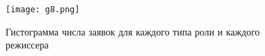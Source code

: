 \documentclass[a3paper]{article}
\begin{document}
	\begin{landscape}
		\begin{figure}[h]
			\setcounter{figure}{40}
			\centering
			\texttt{[image: g8.png]}
			\caption{Гистограмма числа заявок для каждого типа роли и каждого режиссера}
			\label{fig:g8}
		\end{figure}
		
	\end{landscape}    
\end{document}
